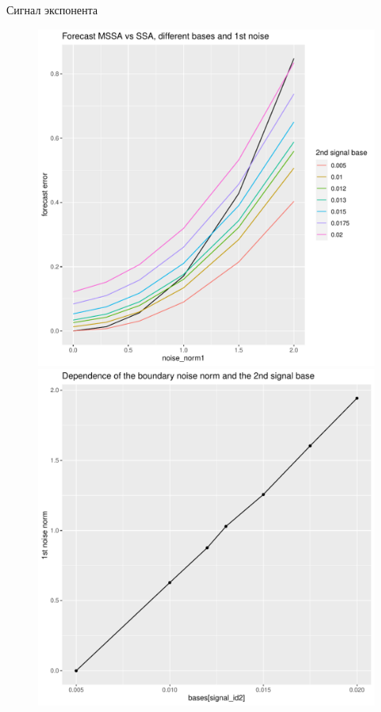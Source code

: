 \documentclass[ucs, notheorems, handout]{beamer}
\newcommand{\SSA}{\mathsf{SSA}}
\newcommand{\MSSA}{\mathsf{MSSA}}
\begin{document}
\begin{frame}{Сигнал экспонента}
    \begin{figure}[h]
        \centering
        \begin{minipage}{.5\textwidth}
            \centering
            \includegraphics[width=\textwidth]{experiment_2_exp1.pdf}
        \end{minipage}%
        \begin{minipage}{.5\textwidth}
            \centering
        \includegraphics[width=\textwidth]{experiment_2_exp2.pdf}

\end{minipage}
\end{figure}
\end{frame}
\end{document}
